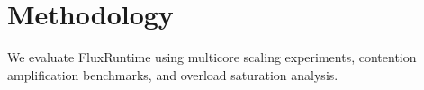 \section{Methodology}

We evaluate FluxRuntime using multicore scaling experiments, contention amplification benchmarks, and overload saturation analysis.
